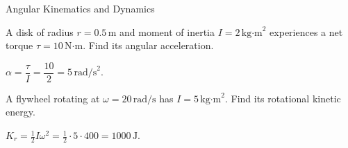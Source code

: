 \begin{KnowledgePoint}{Angular Kinematics and Dynamics \Core}
  \KPProblems
\begin{cheatproblem}
  A disk of radius $r=0.5\,\text{m}$ and moment of inertia $I=2\,\text{kg·m}^2$ experiences a net torque $\tau=10\,\text{N·m}$. Find its angular acceleration.
\begin{solutionbox}
  $\alpha=\dfrac{\tau}{I}=\dfrac{10}{2}=5\,\text{rad/s}^2$.
\end{solutionbox}
\end{cheatproblem}
\begin{cheatproblem}
  A flywheel rotating at $\omega=20\,\text{rad/s}$ has $I=5\,\text{kg·m}^2$. Find its rotational kinetic energy.
\begin{solutionbox}
  $K_r=\tfrac12 I\omega^2=\tfrac12\cdot5\cdot400=1000\,\text{J}$.
\end{solutionbox}
\end{cheatproblem}
\end{KnowledgePoint}

